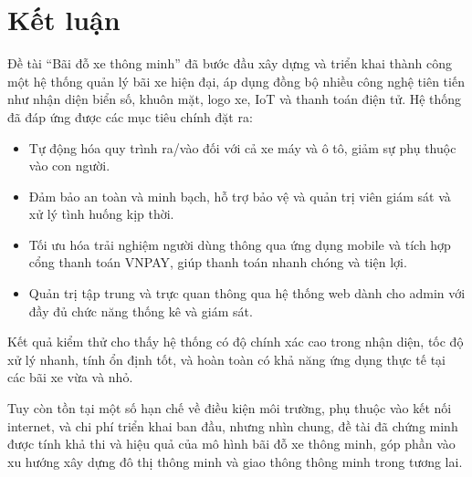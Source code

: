 \section{Kết luận}

Đề tài “Bãi đỗ xe thông minh” đã bước đầu xây dựng và triển khai thành công một hệ thống quản lý bãi xe hiện đại, áp dụng đồng bộ nhiều công nghệ tiên tiến như nhận diện biển số, khuôn mặt, logo xe, IoT và thanh toán điện tử. Hệ thống đã đáp ứng được các mục tiêu chính đặt ra:

\begin{itemize}
    \item Tự động hóa quy trình ra/vào đối với cả xe máy và ô tô, giảm sự phụ thuộc vào con người.
    
    \item Đảm bảo an toàn và minh bạch, hỗ trợ bảo vệ và quản trị viên giám sát và xử lý tình huống kịp thời.
    
    \item Tối ưu hóa trải nghiệm người dùng thông qua ứng dụng mobile và tích hợp cổng thanh toán VNPAY, giúp thanh toán nhanh chóng và tiện lợi.
    
    \item Quản trị tập trung và trực quan thông qua hệ thống web dành cho admin với đầy đủ chức năng thống kê và giám sát.
\end{itemize}

Kết quả kiểm thử cho thấy hệ thống có độ chính xác cao trong nhận diện, tốc độ xử lý nhanh, tính ổn định tốt, và hoàn toàn có khả năng ứng dụng thực tế tại các bãi xe vừa và nhỏ.

Tuy còn tồn tại một số hạn chế về điều kiện môi trường, phụ thuộc vào kết nối internet, và chi phí triển khai ban đầu, nhưng nhìn chung, đề tài đã chứng minh được tính khả thi và hiệu quả của mô hình bãi đỗ xe thông minh, góp phần vào xu hướng xây dựng đô thị thông minh và giao thông thông minh trong tương lai.



